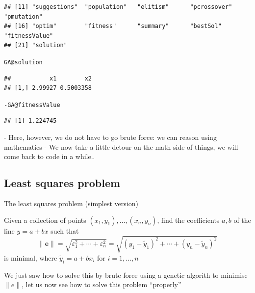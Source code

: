 \documentclass[aspectratio=169]{beamer}\usepackage[]{graphicx}\usepackage[]{xcolor}
\makeatletter
\newcommand{\hlopt}[1]{\textcolor[rgb]{0,0,0}{#1}}%
\newcommand{\hldef}[1]{\textcolor[rgb]{0.345,0.345,0.345}{#1}}%
\newcommand{\hlkwc}[1]{\textcolor[rgb]{0.333,0.667,0.333}{#1}}%
\newenvironment{kframe}{%
 \def\at@end@of@kframe{}%
 \ifinner\ifhmode%
  \def\at@end@of@kframe{\end{minipage}}%
  \begin{minipage}{\columnwidth}%
 \fi\fi%
 \def\FrameCommand##1{\hskip\@totalleftmargin \hskip-\fboxsep
 \colorbox{shadecolor}{##1}\hskip-\fboxsep
     \hskip-\linewidth \hskip-\@totalleftmargin \hskip\columnwidth}%
 \MakeFramed {\advance\hsize-\width
   \@totalleftmargin\z@ \linewidth\hsize
   \@setminipage}}%
 {\par\unskip\endMakeFramed%
 \at@end@of@kframe}
\newenvironment{knitrout}{}{} %
\makeatother
\begin{document}
\begin{frame}[fragile]
\begin{knitrout}
\begin{kframe}
\begin{verbatim}
## [11] "suggestions"  "population"   "elitism"      "pcrossover"   "pmutation"   
## [16] "optim"        "fitness"      "summary"      "bestSol"      "fitnessValue"
## [21] "solution"
\end{verbatim}
\begin{alltt}
\hldef{GA}\hlopt{@}\hlkwc{solution}
\end{alltt}
\begin{verbatim}
##           x1        x2
## [1,] 2.99927 0.5003358
\end{verbatim}
\begin{alltt}
\hlopt{-}\hldef{GA}\hlopt{@}\hlkwc{fitnessValue}
\end{alltt}
\begin{verbatim}
## [1] 1.224745
\end{verbatim}
\end{kframe}
\end{knitrout}

- Here, however, we do not have to go brute force: we can reason using mathematics
- We now take a little detour on the math side of things, we will come back to code in a while..
\end{frame}



\subsection{Least squares problem}

\begin{frame}{The least squares problem (simplest version)}
	\begin{definition}
		Given a collection of points $(x_1,y_1),\ldots,(x_n,y_n)$, find the coefficients $a,b$ of the line $y=a+bx$ such that
		$$
		\|\mathbf{e}\|=\sqrt{\varepsilon_1^2+\cdots+\varepsilon_n^2}
		=\sqrt{(y_1-\tilde y_1)^2+\cdots+(y_n-\tilde y_n)^2}
		$$
		is minimal, where $\tilde y_i=a+bx_i$ for $i=1,\ldots,n$
	\end{definition}
	\vfill
	We just saw how to solve this by brute force using a genetic algorith to minimise $\|e\|$, let us now see how to solve this problem ``properly''
\end{frame}
\end{document}
